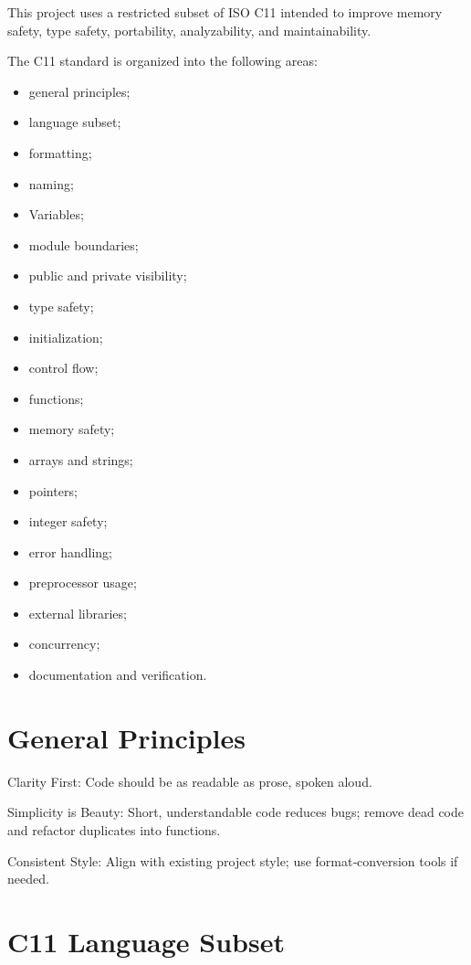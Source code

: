 This project uses a restricted subset of ISO C11 intended to improve memory safety, type safety, portability, analyzability, and maintainability.

The C11 standard is organized into the following areas:

\begin{itemize}
    \item general principles;
    \item language subset;
    \item formatting;
    \item naming;
    \item Variables;
    \item module boundaries;
    \item public and private visibility;
    \item type safety;
    \item initialization;
    \item control flow;
    \item functions;
    \item memory safety;
    \item arrays and strings;
    \item pointers;
    \item integer safety;
    \item error handling;
    \item preprocessor usage;
    \item external libraries;
    \item concurrency;
    \item documentation and verification.
\end{itemize}

\section{General Principles}

Clarity First: Code should be as readable as prose, spoken aloud.

Simplicity is Beauty: Short, understandable code reduces bugs; remove dead code and refactor duplicates into functions.

Consistent Style: Align with existing project style; use format‑conversion tools if needed.

\section{C11 Language Subset}


